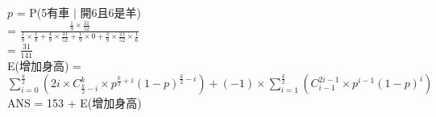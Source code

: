 \documentclass{article}
\begin{document}
\fontsize{15pt}{20pt}\selectfont

\begin{CJK}{UTF8}{bsmi} %
\noindent
$p$ = P(5有車 $\mid$ 開6且6是羊)\\
   = $\frac{\frac{1}{9} \times \frac{31}{52}}{\frac{1}{9}\times\frac{1}{8} + \frac{4}{9}\times\frac{31}{52} + \frac{1}{9}\times0 + \frac{3}{9} \times \frac{21}{52}\times\frac{1}{6}}$\\
   = $\frac{31}{141}$\\

E(增加身高) = $\sum^{\frac{k}{2}}_{i=0} (2i \times C_{\frac{k}{2}-i}^k \times p^{\frac{k}{2}+i}(1-p)^{\frac{k}{2}-i}) + (-1) \times \sum^{\frac{k}{2}}_{i=1} ( C_{i-1}^{2i-1} \times p^{i-1}(1-p)^{i})$\\

ANS = 153 + E(增加身高)
\end{CJK} %
\end{document}
